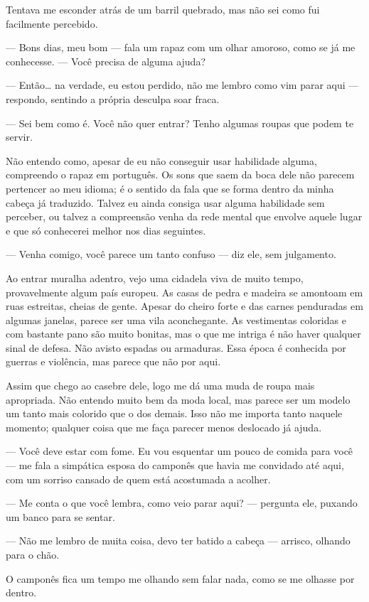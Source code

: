 Tentava me esconder atrás de um barril quebrado, mas não sei como fui facilmente percebido.

— Bons dias, meu bom — fala um rapaz com um olhar amoroso, como se já me conhecesse. — Você precisa de alguma ajuda?

— Então… na verdade, eu estou perdido, não me lembro como vim parar aqui — respondo, sentindo a própria desculpa soar fraca.

— Sei bem como é. Você não quer entrar? Tenho algumas roupas que podem te servir.

Não entendo como, apesar de eu não conseguir usar habilidade alguma, compreendo o rapaz em português. Os sons que saem da boca dele não parecem pertencer ao meu idioma; é o sentido da fala que se forma dentro da minha cabeça já traduzido. Talvez eu ainda consiga usar alguma habilidade sem perceber, ou talvez a compreensão venha da rede mental que envolve aquele lugar e que só conhecerei melhor nos dias seguintes.

— Venha comigo, você parece um tanto confuso — diz ele, sem julgamento.

Ao entrar muralha adentro, vejo uma cidadela viva de muito tempo, provavelmente algum país europeu. As casas de pedra e madeira se amontoam em ruas estreitas, cheias de gente. Apesar do cheiro forte e das carnes penduradas em algumas janelas, parece ser uma vila aconchegante. As vestimentas coloridas e com bastante pano são muito bonitas, mas o que me intriga é não haver qualquer sinal de defesa. Não avisto espadas ou armaduras. Essa época é conhecida por guerras e violência, mas parece que não por aqui.

Assim que chego ao casebre dele, logo me dá uma muda de roupa mais apropriada. Não entendo muito bem da moda local, mas parece ser um modelo um tanto mais colorido que o dos demais. Isso não me importa tanto naquele momento; qualquer coisa que me faça parecer menos deslocado já ajuda.

— Você deve estar com fome. Eu vou esquentar um pouco de comida para você — me fala a simpática esposa do camponês que havia me convidado até aqui, com um sorriso cansado de quem está acostumada a acolher.

— Me conta o que você lembra, como veio parar aqui? — pergunta ele, puxando um banco para se sentar.

— Não me lembro de muita coisa, devo ter batido a cabeça — arrisco, olhando para o chão.

O camponês fica um tempo me olhando sem falar nada, como se me olhasse por dentro.

